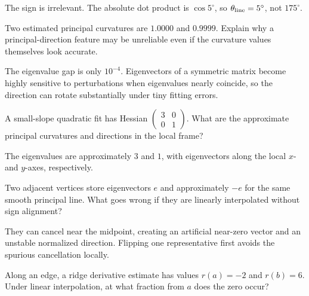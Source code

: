 \begin{solution}
The sign is irrelevant.  The absolute dot product is \(\cos5^\circ\), so \(\theta_{\rm line}=5^\circ\), not \(175^\circ\).
\end{solution}

\begin{problem}\label{prob:vii42-06}
Two estimated principal curvatures are \(1.0000\) and \(0.9999\).  Explain why a principal-direction feature may be unreliable even if the curvature values themselves look accurate.
\end{problem}

\begin{solution}
The eigenvalue gap is only \(10^{-4}\).  Eigenvectors of a symmetric matrix become highly sensitive to perturbations when eigenvalues nearly coincide, so the direction can rotate substantially under tiny fitting errors.
\end{solution}

\begin{problem}\label{prob:vii42-07}
A small-slope quadratic fit has Hessian \(\begin{pmatrix}3&0\\0&1\end{pmatrix}\).  What are the approximate principal curvatures and directions in the local frame?
\end{problem}

\begin{solution}
The eigenvalues are approximately \(3\) and \(1\), with eigenvectors along the local \(x\)- and \(y\)-axes, respectively.
\end{solution}

\begin{problem}\label{prob:vii42-08}
Two adjacent vertices store eigenvectors \(e\) and approximately \(-e\) for the same smooth principal line.  What goes wrong if they are linearly interpolated without sign alignment?
\end{problem}

\begin{solution}
They can cancel near the midpoint, creating an artificial near-zero vector and an unstable normalized direction.  Flipping one representative first avoids the spurious cancellation locally.
\end{solution}

\begin{problem}\label{prob:vii42-09}
Along an edge, a ridge derivative estimate has values \(r(a)=-2\) and \(r(b)=6\).  Under linear interpolation, at what fraction from \(a\) does the zero occur?
\end{problem}

